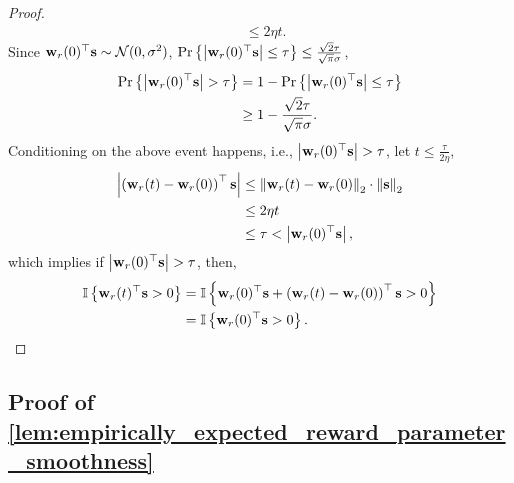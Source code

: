 \begin{proof}
\begin{equation*}
\begin{split}
	&\le 2 \eta t .
\end{split}
\end{equation*}
Since ${\mathbf{w}}_r(0)^\top {\mathbf{s}} \sim {\mathcal{N}}(0, \sigma^2)$, ${\text{Pr}}\left\{ \left| {\mathbf{w}}_r(0)^\top {\mathbf{s}} \right| \le \tau\right\} \le  \frac{\sqrt{2}\tau}{\sqrt{\pi}\sigma}$,
\begin{equation*}
\begin{split}
	{\text{Pr}}\left\{ \left| {\mathbf{w}}_r(0)^\top {\mathbf{s}} \right| > \tau\right\} &= 1 - {\text{Pr}}\left\{ \left| {\mathbf{w}}_r(0)^\top {\mathbf{s}} \right| \le \tau\right\} \\
	&\ge 1 - \frac{\sqrt{2}\tau}{\sqrt{\pi}\sigma}.
\end{split}
\end{equation*}
Conditioning on the above event happens, i.e., $ \left| {\mathbf{w}}_r(0)^\top {\mathbf{s}} \right| > \tau$, let $t \le \frac{\tau}{ 2 \eta }$,
\begin{equation*}
\begin{split}
	\left| \left( {\mathbf{w}}_r(t) - {\mathbf{w}}_r(0) \right)^\top {\mathbf{s}} \right| &\le \left\| {\mathbf{w}}_r(t) - {\mathbf{w}}_r(0) \right\|_2 \cdot \left\| {\mathbf{s}} \right\|_2 \\
	&\le 2 \eta t \\
	&\le \tau < \left| {\mathbf{w}}_r(0)^\top {\mathbf{s}} \right|,
\end{split}
\end{equation*}
which implies if $\left| {\mathbf{w}}_r(0)^\top {\mathbf{s}} \right| > \tau$, then,
\begin{equation*}
\begin{split}
	{\mathbb{I}}\left\{ {\mathbf{w}}_r(t)^\top {\mathbf{s}} > 0 \right\} &= {\mathbb{I}}\left\{ {\mathbf{w}}_r(0)^\top {\mathbf{s}}  + \left( {\mathbf{w}}_r(t) - {\mathbf{w}}_r(0) \right)^\top {\mathbf{s}} > 0 \right\} \\
	&= {\mathbb{I}}\left\{ {\mathbf{w}}_r(0)^\top {\mathbf{s}} > 0 \right\}. \qedhere
\end{split}
\end{equation*}
\end{proof}

\subsection{Proof of \cref{lem:empirically_expected_reward_parameter_smoothness}}

